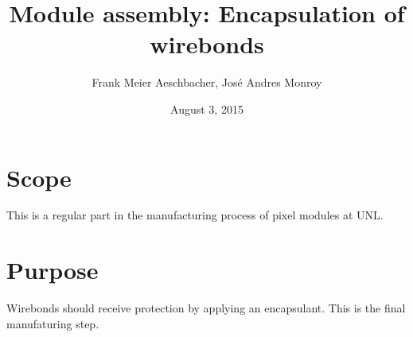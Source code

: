 \documentclass[12pt]{unlsilabsop}
\title{Module assembly: Encapsulation of wirebonds}
\date{August 3, 2015}
\author{Frank Meier Aeschbacher, José Andres Monroy}
\begin{document}
\maketitle

\section{Scope}
This is a regular part in the manufacturing process of pixel modules at UNL.

\section{Purpose}
Wirebonds should receive protection by applying an encapsulant. This is the final manufaturing step.



\end{document}
